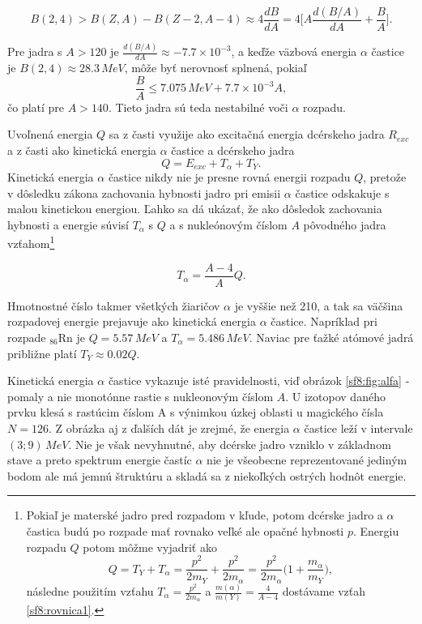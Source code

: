\documentclass[../../main.tex]{subfiles}
\begin{document}
$$ B(2,4) > B(Z,A)-B(Z-2,A-4) \approx 4\frac{dB}{dA} = 4 \bigg[ A \frac{d(B/A)}{dA}+\frac{B}{A} \bigg].$$

Pre jadra s $A>120$ je $\frac{d(B/A)}{dA} \approx -7.7\times10^{-3}$, a keďže väzbová energia $\alpha$ častice je $B(2,4)\approx 28.3\,MeV$,
môže byť nerovnosť splnená, pokiaľ 
$$\frac{B}{A}\leq 7.075\,MeV + 7.7\times 10^{-3}A ,$$
čo platí pre $A>140$. Tieto jadra sú teda nestabilné voči $\alpha$ rozpadu.

Uvoľnená energia $Q$ sa z časti využije ako excitačná energia dcérskeho jadra $R_{exc}$ a z časti ako kinetická energia $\alpha$ častice a dcérskeho jadra
$$ Q = E_{exc}+T_{\alpha}+T_Y .$$
Kinetická energia $\alpha$ častice nikdy nie je presne rovná energii rozpadu $Q$, pretože v dôsledku zákona zachovania hybnosti jadro pri emisii $\alpha$ častice odskakuje s malou kinetickou energiou. Ľahko sa dá ukázať, že ako dôsledok zachovania hybnosti a energie súvisí $T_{\alpha}$
s $Q$ a s nukleónovým číslom $A$ pôvodného jadra vzťahom\footnote{Pokiaľ je materské jadro pred rozpadom v kľude, potom dcérske jadro a $\alpha$ častica budú po rozpade mať rovnako veľké ale opačné hybnosti $p$. Energiu rozpadu $Q$ potom môžme vyjadriť ako $$ Q=T_Y+T_{\alpha}=\frac{p^2}{2m_Y}+\frac{p^2}{2m_{\alpha}}= \frac{p^2}{2m_{\alpha}}\bigg(1 + \frac{m_{\alpha}}{m_Y} \bigg), $$ 
následne použitím vzťahu $T_{\alpha} = \frac{p^2}{2m_{\alpha}}$ a $\frac{m(\alpha)}{m(Y)}= \frac{4}{A-4}$ dostávame vzťah \ref{sf8:rovnica1}.} 

\begin{equation}
T_{\alpha} = \frac{A-4}{A}Q.
\label{sf8:rovnica1}
\end{equation}

Hmotnostné číslo takmer všetkých žiaričov $\alpha$ je vyššie než 210, a tak sa väčšina rozpadovej energie prejavuje ako kinetická energia $\alpha$ častice. Napríklad pri rozpade $_{86}$Rn je $Q = 5.57\,\unit{MeV}$ a $T_{\alpha}  = 5.486\,\unit{MeV}.$ Naviac pre ťažké atómové jadrá približne platí $T_Y\approx 0.02Q.$

Kinetická energia $\alpha$ častice vykazuje isté pravidelnosti, viď obrázok \ref{sf8:fig:alfa} - pomaly a nie monotónne rastie s nukleonovým číslom $A$. U izotopov daného prvku klesá s rastúcim číslom A s výnimkou úzkej oblasti u magického čísla $N=126$. Z obrázka aj z ďalších dát je zrejmé, že energia $\alpha$ častice leží v intervale $(3;9)\,\unit{MeV}$. Nie je však nevyhnutné, aby dcérske jadro vzniklo v základnom stave a preto spektrum energie častíc $\alpha$ nie je všeobecne reprezentované jediným bodom ale má jemnú štruktúru a skladá sa z niekoľkých ostrých hodnôt energie. 
\end{document}
